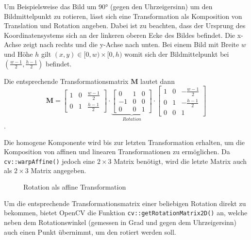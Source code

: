 \documentclass{whswinvcbook}
\begin{document}
Um Beispielsweise das Bild um 90° (gegen den Uhrzeigersinn) um den Bildmittelpunkt zu rotieren, lässt sich eine Transformation als Komposition von Translation und Rotation angeben. Dabei ist zu beachten, dass der Ursprung des Koordinatensystems sich an der linkeren oberen Ecke des Bildes befindet. Die x-Achse zeigt nach rechts und die y-Achse nach unten. Bei einem Bild mit Breite $w$ und Höhe $h$ gilt $(x,y)\in[0,w)\times[0,h)$ womit sich der Bildmittelpunkt bei $(\frac{w-1}{2},\frac{h-1}{2})$ befindet.

Die entsprechende Transformationsmatrix $\mathbf{M}$ lautet dann $$\mathbf{M}=\begin{bmatrix}1&0&\frac{w-1}{2}\\0&1&\frac{h-1}{2}\end{bmatrix}\cdot\underbrace{\begin{bmatrix}0&1&0\\-1&0&0\\0&0&1\end{bmatrix}}_{Rotation}\cdot\begin{bmatrix}1&0&-\frac{w-1}{2}\\0&1&-\frac{h-1}{2}\\0&0&1\end{bmatrix}$$.

Die homogene Komponente wird bis zur letzten Transformation erhalten, um die Komposition von affinen und linearen Transformationen zu ermöglichen. Da \texttt{cv::warpAffine()} jedoch eine $2\times3$ Matrix benötigt, wird die letzte Matrix auch als $2\times3$ Matrix angegeben.
\begin{figure}[H]
    \centering
    \quad\quad\quad\quad
    \caption{Rotation als affine Transformation}
    \label{fig-opencv-affine-1}
\end{figure}
Um die entsprechende Transformationsmatrix einer beliebigen Rotation direkt zu bekommen, bietet OpenCV die Funktion \texttt{cv::getRotationMatrix2D()} an, welche neben dem Rotationswinkel (gemessen in Grad und gegen dem Uhrzeigersinn) auch einen Punkt übernimmt, um den rotiert werden soll.
\end{document}
